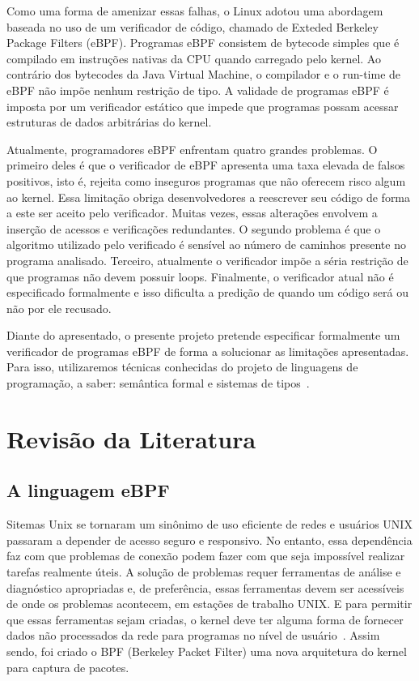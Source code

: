 \documentclass[paper=a4, fontsize=12pt]{article}
\theoremstyle{definition}
\begin{document}
Como uma forma de amenizar essas falhas, o Linux adotou uma abordagem baseada no uso de um
verificador de código, chamado de Exteded Berkeley Package Filters (eBPF). Programas eBPF
consistem de bytecode simples que é compilado em instruções nativas da CPU quando carregado pelo
kernel. Ao contrário dos bytecodes da Java Virtual Machine, o compilador e o run-time de eBPF
não impõe nenhum restrição de tipo. A validade de programas eBPF é imposta por um
verificador estático que impede que programas possam acessar estruturas de dados arbitrárias
do kernel.

Atualmente, programadores eBPF enfrentam quatro grandes problemas. O primeiro deles é que
o verificador de eBPF apresenta uma taxa elevada de falsos positivos, isto é, rejeita como
inseguros programas que não oferecem risco algum ao kernel. Essa limitação obriga desenvolvedores
a reescrever seu código de forma a este ser aceito pelo verificador. Muitas vezes, essas
alterações envolvem a inserção de acessos e verificações redundantes. O segundo problema é que
o algoritmo utilizado pelo verificado é sensível ao número de caminhos presente no programa analisado.
Terceiro, atualmente o verificador impõe a séria restrição de que programas não devem possuir loops.
Finalmente, o verificador atual não é especificado formalmente e isso dificulta a predição de quando
um código será ou não por ele recusado.

Diante do apresentado, o presente projeto pretende especificar formalmente um verificador de
programas eBPF de forma a solucionar as limitações apresentadas. Para isso, utilizaremos técnicas
conhecidas do projeto de linguagens de programação, a saber: semântica formal e
sistemas de tipos~\cite{Pierce02,Klein12,Chang17}.


\section{Revisão da Literatura}

\subsection{A linguagem eBPF}

Sitemas Unix se tornaram um sinônimo de uso eficiente de redes e usuários UNIX passaram a depender
de acesso seguro e responsivo. No entanto, essa dependência faz com que problemas de conexão podem
fazer com que seja impossível realizar tarefas realmente úteis. A solução de problemas requer 
ferramentas de análise e diagnóstico apropriadas e, de preferência, essas ferramentas devem ser 
acessíveis de onde os problemas acontecem, em estações de trabalho UNIX.  E para permitir que essas
ferramentas sejam criadas, o kernel deve ter alguma forma de fornecer dados não processados da rede
para programas no nível de usuário~\cite{McCanne93}. Assim sendo, foi criado o BPF (Berkeley Packet 
Filter) uma nova arquitetura do kernel para captura de pacotes.
\end{document}
